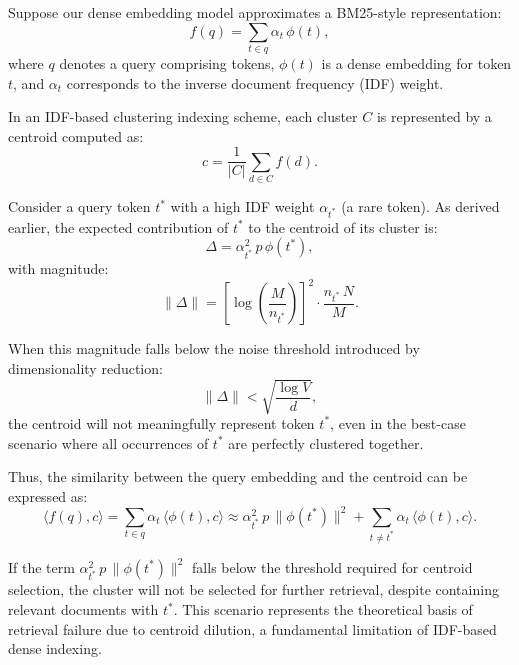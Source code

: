 \documentclass[manuscript]{acmart}
\begin{document}
Suppose our dense embedding model approximates a BM25-style representation:
\begin{equation}
  f(q) = \sum_{t \in q} \alpha_t \, \phi(t),
\end{equation}
where $q$ denotes a query comprising tokens, $\phi(t)$ is a dense embedding for token $t$, and $\alpha_t$ corresponds to the inverse document frequency (IDF) weight.

In an IDF-based clustering indexing scheme, each cluster $C$ is represented by a centroid computed as:
\begin{equation}
  c = \frac{1}{|C|} \sum_{d \in C} f(d).
\end{equation}

Consider a query token $t^*$ with a high IDF weight $\alpha_{t^*}$ (a rare token). As derived earlier, the expected contribution of $t^*$ to the centroid of its cluster is:
\begin{equation}
  \Delta = \alpha_{t^*}^2\, p\, \phi(t^*),
\end{equation}
with magnitude:
\begin{equation}
  \|\Delta\| = \left[\log\!\left(\frac{M}{n_{t^*}}\right)\right]^2 \cdot \frac{n_{t^*}\, N}{M}.
\end{equation}

When this magnitude falls below the noise threshold introduced by dimensionality reduction:
\begin{equation}
  \|\Delta\| < \sqrt{\frac{\log V}{d}},
\end{equation}
the centroid will not meaningfully represent token $t^*$, even in the best-case scenario where all occurrences of $t^*$ are perfectly clustered together.

Thus, the similarity between the query embedding and the centroid can be expressed as:
\begin{equation}
  \langle f(q), c \rangle 
  = \sum_{t \in q} \alpha_t \, \langle \phi(t), c \rangle
  \approx \alpha_{t^*}^2 \, p \, \|\phi(t^*)\|^2 + \sum_{t \neq t^*} \alpha_t \, \langle \phi(t), c \rangle.
\end{equation}

If the term $\alpha_{t^*}^2 \, p \, \|\phi(t^*)\|^2$ falls below the threshold required for centroid selection, the cluster will not be selected for further retrieval, despite containing relevant documents with $t^*$. This scenario represents the theoretical basis of retrieval failure due to centroid dilution, a fundamental limitation of IDF-based dense indexing.
\end{document}
